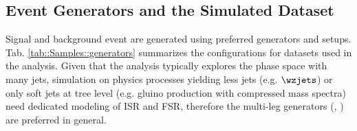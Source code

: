 \clearpage
\subsection{Event Generators and the Simulated Dataset}

Signal and background event are generated using preferred generators and setups. 
Tab. \ref{tab::Samples::generators} summarizes the configurations for datasets used in the analysis.
Given that the analysis typically explores the phase space with many jets, simulation on physics processes yielding less jets (e.g. $\wzjets$) or only soft jets at tree level (e.g. gluino production with compressed mass spectra) need dedicated modeling of ISR and FSR, therefore the multi-leg generators (\sherpa, \mgmc) are preferred in general. 

